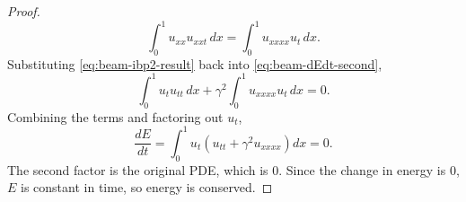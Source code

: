 \documentclass[11pt]{article}
\theoremstyle{definition}
\begin{document}
\begin{proof}
\begin{equation}
\int_0^1 u_{xx} u_{xxt} \, dx = \int_0^1 u_{xxxx} u_t \, dx.
\end{equation}
Substituting \eqref{eq:beam-ibp2-result} back into
\eqref{eq:beam-dEdt-second},
\begin{equation} \label{eq:beam-dEdt-sub}
\int_0^1 u_t u_{tt} \, dx + \gamma^2 \int_0^1 u_{xxxx} u_t \, dx = 0.
\end{equation}
Combining the terms and factoring out $u_t$,
\begin{equation} \label{eq:beam-dEdt-factored}
\frac{dE}{dt}
  = \int_0^1 u_t \left( u_{tt} + \gamma^2 u_{xxxx} \right) dx = 0.
\end{equation}
The second factor is the original PDE, which is 0. Since the change in energy
is 0, $E$ is constant in time, so energy is conserved.
\end{proof}
\end{document}

